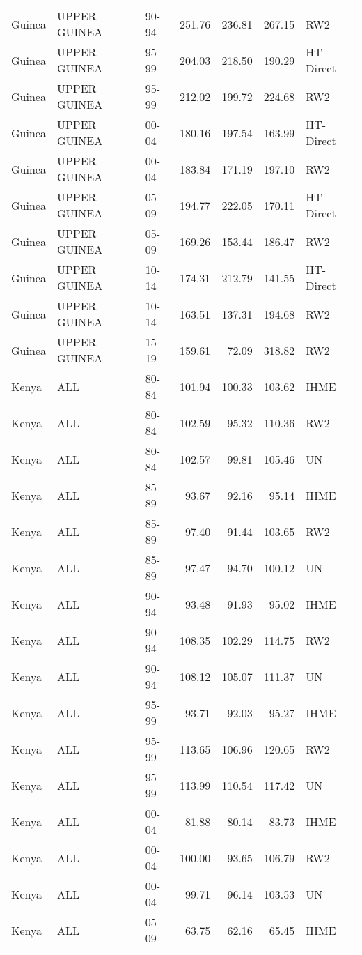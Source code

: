 \begin{longtable}{lllrrrl}
  Guinea & UPPER GUINEA & 90-94 & 251.76 & 236.81 & 267.15 & RW2 \\ 
  Guinea & UPPER GUINEA & 95-99 & 204.03 & 218.50 & 190.29 & HT-Direct \\ 
  Guinea & UPPER GUINEA & 95-99 & 212.02 & 199.72 & 224.68 & RW2 \\ 
  Guinea & UPPER GUINEA & 00-04 & 180.16 & 197.54 & 163.99 & HT-Direct \\ 
  Guinea & UPPER GUINEA & 00-04 & 183.84 & 171.19 & 197.10 & RW2 \\ 
  Guinea & UPPER GUINEA & 05-09 & 194.77 & 222.05 & 170.11 & HT-Direct \\ 
  Guinea & UPPER GUINEA & 05-09 & 169.26 & 153.44 & 186.47 & RW2 \\ 
  Guinea & UPPER GUINEA & 10-14 & 174.31 & 212.79 & 141.55 & HT-Direct \\ 
  Guinea & UPPER GUINEA & 10-14 & 163.51 & 137.31 & 194.68 & RW2 \\ 
  Guinea & UPPER GUINEA & 15-19 & 159.61 & 72.09 & 318.82 & RW2 \\ 
  Kenya & ALL & 80-84 & 101.94 & 100.33 & 103.62 & IHME \\ 
  Kenya & ALL & 80-84 & 102.59 & 95.32 & 110.36 & RW2 \\ 
  Kenya & ALL & 80-84 & 102.57 & 99.81 & 105.46 & UN \\ 
  Kenya & ALL & 85-89 & 93.67 & 92.16 & 95.14 & IHME \\ 
  Kenya & ALL & 85-89 & 97.40 & 91.44 & 103.65 & RW2 \\ 
  Kenya & ALL & 85-89 & 97.47 & 94.70 & 100.12 & UN \\ 
  Kenya & ALL & 90-94 & 93.48 & 91.93 & 95.02 & IHME \\ 
  Kenya & ALL & 90-94 & 108.35 & 102.29 & 114.75 & RW2 \\ 
  Kenya & ALL & 90-94 & 108.12 & 105.07 & 111.37 & UN \\ 
  Kenya & ALL & 95-99 & 93.71 & 92.03 & 95.27 & IHME \\ 
  Kenya & ALL & 95-99 & 113.65 & 106.96 & 120.65 & RW2 \\ 
  Kenya & ALL & 95-99 & 113.99 & 110.54 & 117.42 & UN \\ 
  Kenya & ALL & 00-04 & 81.88 & 80.14 & 83.73 & IHME \\ 
  Kenya & ALL & 00-04 & 100.00 & 93.65 & 106.79 & RW2 \\ 
  Kenya & ALL & 00-04 & 99.71 & 96.14 & 103.53 & UN \\ 
  Kenya & ALL & 05-09 & 63.75 & 62.16 & 65.45 & IHME \\ 

\end{longtable}
